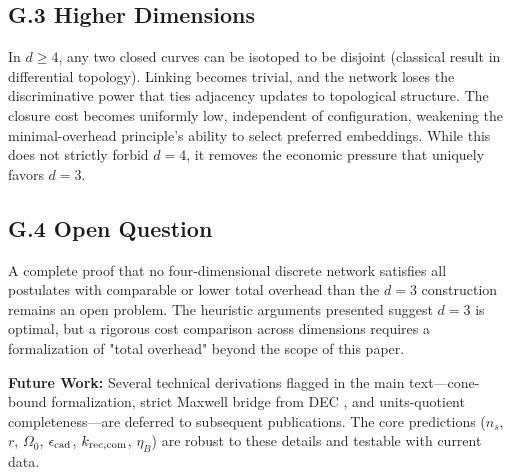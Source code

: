 \documentclass[11pt]{article}
\theoremstyle{definition}
\theoremstyle{remark}
\begin{document}
\subsection*{G.3 Higher Dimensions}
In \(d \geq 4\), any two closed curves can be isotoped to be disjoint (classical result in differential topology). Linking becomes trivial, and the network loses the discriminative power that ties adjacency updates to topological structure. The closure cost becomes uniformly low, independent of configuration, weakening the minimal-overhead principle's ability to select preferred embeddings. While this does not strictly forbid \(d=4\), it removes the economic pressure that uniquely favors \(d=3\).

\subsection*{G.4 Open Question}
A complete proof that no four-dimensional discrete network satisfies all postulates with comparable or lower total overhead than the \(d=3\) construction remains an open problem. The heuristic arguments presented suggest \(d=3\) is optimal, but a rigorous cost comparison across dimensions requires a formalization of "total overhead" beyond the scope of this paper.

\bigskip
\noindent\textbf{Future Work:} 
Several technical derivations flagged in the main text—cone-bound formalization, strict Maxwell bridge from DEC \citep{DesbrunDEC2005}, and units-quotient completeness—are deferred to subsequent publications. The core predictions (\(n_s\), \(r\), \(\Omega_0\), \(\epsilon_{\rm cad}\), \(k_{\rm rec,com}\), \(\eta_B\)) are robust to these details and testable with current data.



\end{document}
